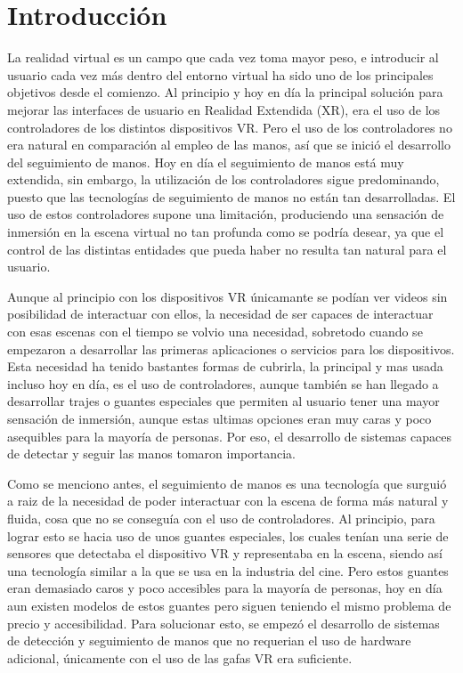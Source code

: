 \documentclass[a4paper, 12pt]{book}
\begin{document}
\chapter{Introducción}
\label{sec:intro} %
La realidad virtual es un campo que cada vez toma mayor peso, e introducir al usuario cada vez más dentro del entorno virtual ha sido uno de los principales objetivos desde el comienzo. Al principio y hoy en día la principal 
solución para mejorar las interfaces de usuario en Realidad Extendida (XR), era el uso de los controladores de los distintos dispositivos VR. Pero el uso de los controladores no era natural en comparación al empleo de las manos, así que se inició el desarrollo del seguimiento de manos. Hoy en 
día el seguimiento de manos está muy extendida, sin embargo, la utilización de los controladores sigue predominando, puesto que las tecnologías de seguimiento de manos no están tan desarrolladas. El uso de estos controladores supone una limitación, produciendo una sensación de inmersión en la escena virtual no tan profunda como se podría desear, ya que 
el control de las distintas entidades que pueda haber no resulta tan natural para el usuario.  

Aunque al principio con los dispositivos VR únicamante se podían ver videos sin posibilidad de interactuar con ellos, la necesidad de ser capaces de interactuar con esas escenas con el tiempo se volvio una necesidad, sobretodo cuando se empezaron a desarrollar las primeras aplicaciones o servicios para los dispositivos. 
Esta necesidad ha tenido bastantes formas de cubrirla, la principal y mas usada incluso hoy en día, es el uso de controladores, aunque también se han llegado a desarrollar trajes o guantes especiales que permiten al usuario tener una mayor sensación de inmersión, aunque estas ultimas opciones eran muy caras y poco asequibles para la mayoría de personas. Por eso,
el desarrollo de sistemas capaces de detectar y seguir las manos tomaron importancia.

Como se menciono antes, el seguimiento de manos es una tecnología que surguió a raiz de la necesidad de poder interactuar con la escena de forma más natural y fluida, cosa que no se conseguía con el uso de controladores. Al principio, para lograr esto se hacia uso de unos guantes especiales, los cuales tenían una serie de sensores que detectaba el dispositivo VR y representaba en la escena, siendo así una tecnología similar a la que se usa en la industria del cine.
Pero estos guantes eran demasiado caros y poco accesibles para la mayoría de personas, hoy en día aun existen modelos de estos guantes pero siguen teniendo el mismo problema de precio y accesibilidad. Para solucionar esto, se empezó el desarrollo de sistemas de detección y seguimiento de manos que no requerian el uso de hardware adicional, únicamente con el uso de las gafas VR era suficiente. 
\end{document}
